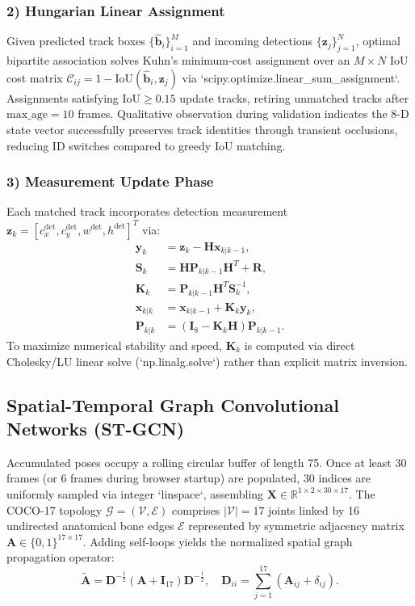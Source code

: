 \documentclass[conference]{IEEEtran}
\begin{document}
\subsubsection*{2) Hungarian Linear Assignment}
Given predicted track boxes $\{\hat{\mathbf{b}}_i\}_{i=1}^{M}$ and incoming detections $\{\mathbf{z}_j\}_{j=1}^{N}$, optimal bipartite association solves Kuhn's minimum-cost assignment \cite{b4} over an $M \times N$ IoU cost matrix $\mathcal{C}_{ij} = 1 - \text{IoU}(\hat{\mathbf{b}}_i, \mathbf{z}_j)$ via `scipy.optimize.linear_sum_assignment`. Assignments satisfying $\text{IoU} \ge 0.15$ update tracks, retiring unmatched tracks after $\text{max\_age} = 10$ frames. Qualitative observation during validation indicates the 8-D state vector successfully preserves track identities through transient occlusions, reducing ID switches compared to greedy IoU matching.

\subsubsection*{3) Measurement Update Phase}
Each matched track incorporates detection measurement $\mathbf{z}_k = [c_x^{\text{det}}, c_y^{\text{det}}, w^{\text{det}}, h^{\text{det}}]^T$ via:
\begin{align}
\mathbf{y}_k &= \mathbf{z}_k - \mathbf{H}\mathbf{x}_{k|k-1}, \\
\mathbf{S}_k &= \mathbf{H}\mathbf{P}_{k|k-1}\mathbf{H}^T + \mathbf{R}, \\
\mathbf{K}_k &= \mathbf{P}_{k|k-1}\mathbf{H}^T\mathbf{S}_k^{-1}, \\
\mathbf{x}_{k|k} &= \mathbf{x}_{k|k-1} + \mathbf{K}_k\mathbf{y}_k, \\
\mathbf{P}_{k|k} &= (\mathbf{I}_8 - \mathbf{K}_k\mathbf{H})\mathbf{P}_{k|k-1}.
\end{align}
To maximize numerical stability and speed, $\mathbf{K}_k$ is computed via direct Cholesky/LU linear solve (`np.linalg.solve`) rather than explicit matrix inversion.

\subsection{Spatial-Temporal Graph Convolutional Networks (ST-GCN)}
Accumulated poses occupy a rolling circular buffer of length 75. Once at least 30 frames (or 6 frames during browser startup) are populated, 30 indices are uniformly sampled via integer `linspace`, assembling $\mathbf{X} \in \mathbb{R}^{1 \times 2 \times 30 \times 17}$. The COCO-17 topology $\mathcal{G} = (\mathcal{V}, \mathcal{E})$ comprises $|\mathcal{V}|=17$ joints linked by 16 undirected anatomical bone edges $\mathcal{E}$ represented by symmetric adjacency matrix $\mathbf{A} \in \{0, 1\}^{17 \times 17}$. Adding self-loops yields the normalized spatial graph propagation operator:
\begin{equation}
\tilde{\mathbf{A}} = \mathbf{D}^{-\frac{1}{2}} (\mathbf{A} + \mathbf{I}_{17}) \mathbf{D}^{-\frac{1}{2}}, \quad \mathbf{D}_{ii} = \sum_{j=1}^{17}(\mathbf{A}_{ij} + \delta_{ij}).
\end{equation}
\end{document}
